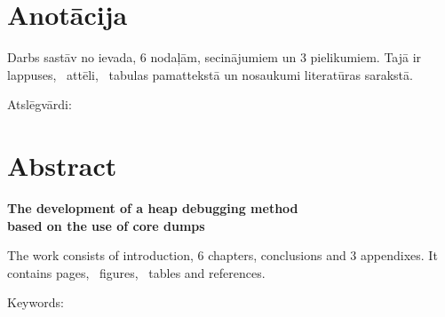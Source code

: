 \chapter*{Anotācija}
\thispagestyle{empty}
	

	Darbs sastāv no ievada, 6 nodaļām, secinājumiem un 3 pielikumiem. Tajā ir \pageref{LastPage} lappuses, \totfig\ attēli, \tottab\ tabulas pamattekstā un  nosaukumi literatūras sarakstā.

Atslēgvārdi:
\newpage
\chapter*{Abstract}
\begin{center}
\linespread{1.2}
\vspace{-0.3cm}
\large \textbf {The development of a heap debugging method \protect\\  based on the use of core dumps}
\end{center}

\thispagestyle{empty}
	The work consists of introduction, 6 chapters, conclusions and 3 appendixes. It contains \pageref{LastPage} pages, \totfig\ figures, \tottab\ tables and  references.

Keywords:\newpage 